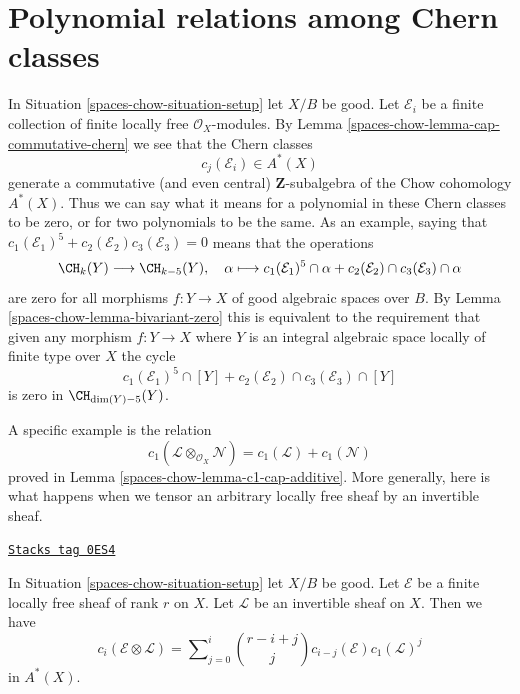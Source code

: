 \section{Polynomial relations among Chern classes}
\label{spaces-chow-section-relations-chern-classes}
In Situation \ref{spaces-chow-situation-setup} let $X/B$ be good.
Let $\mathcal{E}_i$ be a finite collection of finite locally
free $\mathcal{O}_X$-modules. By Lemma \ref{spaces-chow-lemma-cap-commutative-chern}
we see that the Chern classes
$$
c_j(\mathcal{E}_i) \in A^*(X)
$$
generate a commutative (and even central) $\mathbf{Z}$-subalgebra of the
Chow cohomology $A^*(X)$.
Thus we can say what it means for a polynomial in these Chern classes
to be zero, or for two polynomials to be the same. As an example, saying that
$c_1(\mathcal{E}_1)^5 + c_2(\mathcal{E}_2)c_3(\mathcal{E}_3) = 0$
means that the operations
$$
\CH_k(Y) \longrightarrow \CH_{k - 5}(Y), \quad
\alpha \longmapsto
c_1(\mathcal{E}_1)^5 \cap \alpha +
c_2(\mathcal{E}_2) \cap c_3(\mathcal{E}_3) \cap \alpha
$$
are zero for all morphisms $f : Y \to X$ of good algebraic spaces over $B$.
By Lemma \ref{spaces-chow-lemma-bivariant-zero}
this is equivalent to the requirement that given any morphism
$f : Y \to X$ where $Y$ is an integral algebraic space
locally of finite type over $X$ the cycle
$$
c_1(\mathcal{E}_1)^5 \cap [Y] +
c_2(\mathcal{E}_2) \cap c_3(\mathcal{E}_3) \cap [Y]
$$
is zero in $\CH_{\dim(Y) - 5}(Y)$.

\medskip\noindent
A specific example is the relation
$$
c_1(\mathcal{L} \otimes_{\mathcal{O}_X} \mathcal{N})
=
c_1(\mathcal{L}) + c_1(\mathcal{N})
$$
proved in Lemma \ref{spaces-chow-lemma-c1-cap-additive}.
More generally, here is what happens when we tensor an
arbitrary locally free sheaf by an invertible sheaf.

\begin{lemma}
\label{spaces-chow-lemma-chern-classes-E-tensor-L}
\href{https://stacks.math.columbia.edu/tag/0ES4}{\texttt{Stacks tag 0ES4}}

In Situation \ref{spaces-chow-situation-setup} let $X/B$ be good.
Let $\mathcal{E}$ be a finite locally free sheaf of
rank $r$ on $X$. Let $\mathcal{L}$ be an invertible
sheaf on $X$. Then we have
\begin{equation}
\label{equation-twist}
c_i({\mathcal E} \otimes {\mathcal L})
=
\sum\nolimits_{j = 0}^i
\binom{r - i + j}{j} c_{i - j}({\mathcal E}) c_1({\mathcal L})^j
\end{equation}
in $A^*(X)$.
\end{lemma}

